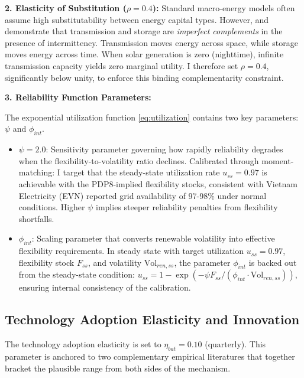 \documentclass[12pt, a4paper]{article}
\begin{document}
\textbf{2. Elasticity of Substitution ($\rho = 0.4$):}
Standard macro-energy models often assume high substitutability between energy capital types. However, \citet{hart2019} and \citet{hirth2013} demonstrate that transmission and storage are \textit{imperfect complements} in the presence of intermittency. Transmission moves energy across space, while storage moves energy across time. When solar generation is zero (nighttime), infinite transmission capacity yields zero marginal utility. I therefore set $\rho = 0.4$, significantly below unity, to enforce this binding complementarity constraint.

\textbf{3. Reliability Function Parameters:}

The exponential utilization function \eqref{eq:utilization} contains two key parameters: $\psi$ and $\phi_{int}$.

\begin{itemize}
    \item $\psi = 2.0$: Sensitivity parameter governing how rapidly reliability degrades when the flexibility-to-volatility ratio declines. Calibrated through moment-matching: I target that the steady-state utilization rate $u_{ss} = 0.97$ is achievable with the PDP8-implied flexibility stocks, consistent with Vietnam Electricity (EVN) reported grid availability of 97-98\% under normal conditions. Higher $\psi$ implies steeper reliability penalties from flexibility shortfalls.
    
    \item $\phi_{int}$: Scaling parameter that converts renewable volatility into effective flexibility requirements. In steady state with target utilization $u_{ss} = 0.97$, flexibility stock $F_{ss}$, and volatility $\text{Vol}_{ren,ss}$, the parameter $\phi_{int}$ is backed out from the steady-state condition: $u_{ss} = 1 - \exp(-\psi F_{ss}/(\phi_{int} \cdot \text{Vol}_{ren,ss}))$, ensuring internal consistency of the calibration.
\end{itemize}


\subsection{Technology Adoption Elasticity and Innovation}

The technology adoption elasticity is set to $\eta_{bat} = 0.10$ (quarterly). This parameter is anchored to two complementary empirical literatures that together bracket the plausible range from both sides of the mechanism.
\end{document}
